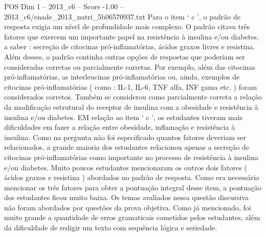 \begin{textsample}{POS Dim 1 – 2013\_c6 – Score -1.00 – 2013\_c6/enade\_2013\_nutri\_5b06570937.txt}
Para o item ‘ c ’, o padrão de resposta exigia um nível de profundidade mais complexo.
O padrão citava três fatores que exercem um importante papel na resistência à insulina e/ou diabetes, a saber : secreção de citocinas pró-inflamatórias, ácidos graxos livres e resistina.
Além desses, o padrão continha outras opções de respostas que poderiam ser consideradas corretas ou parcialmente corretas.
Por exemplo, além das citocinas pró-inflamatórias, as interleucinas pró-inflamatórias ou, ainda, exemplos de citocinas pró-inflamatórias ( como : IL-1, IL-6, TNF alfa, INF gama etc. ) foram considerados corretos.
Também se considerou como parcialmente correta a relação da modificação estrutural do receptor de insulina com a obesidade e resistência à insulina e/ou diabetes.
EM relação ao item ‘ c ’, os estudantes tiveram mais dificuldades em fazer a relação entre obesidade, inflamação e resistência à insulina.
Como na pergunta não foi especificado quantos fatores deveriam ser relacionados, a grande maioria dos estudantes relacionou apenas a secreção de citocinas pró-inflamatórias como importante no processo de resistência à insulina e/ou diabetes.
Muito poucos estudantes mencionaram os outros dois fatores ( ácidos graxos e resistina ) abordados no padrão de resposta.
Como era necessário mencionar os três fatores para obter a pontuação integral desse item, a pontuação dos estudantes ficou muito baixa.
Os temas avaliados nessa questão discursiva não foram abordados por questões da prova objetiva.
Como já mencionado, foi muito grande a quantidade de erros gramaticais cometidos pelos estudantes, além da dificuldade de redigir um texto com sequência lógica e seriedade.

\end{textsample}
